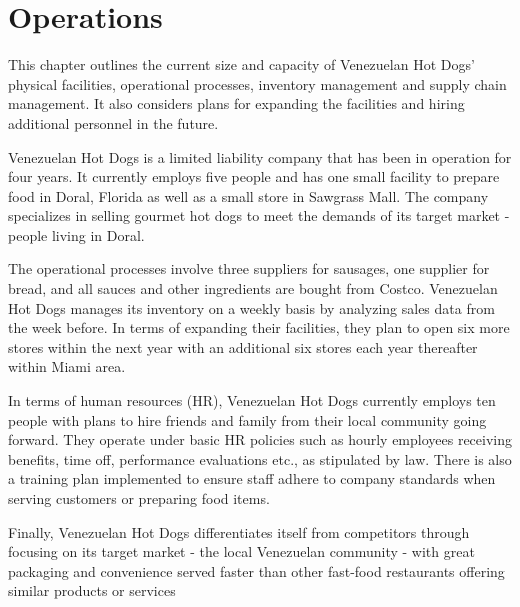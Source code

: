 

\section{Operations}\label{sec:operations}
This chapter outlines the current size and capacity of Venezuelan Hot Dogs' physical facilities, operational processes, inventory management and supply chain management. It also considers plans for expanding the facilities and hiring additional personnel in the future. 

Venezuelan Hot Dogs is a limited liability company that has been in operation for four years. It currently employs five people and has one small facility to prepare food in Doral, Florida as well as a small store in Sawgrass Mall. The company specializes in selling gourmet hot dogs to meet the demands of its target market - people living in Doral. 

The operational processes involve three suppliers for sausages, one supplier for bread, and all sauces and other ingredients are bought from Costco. Venezuelan Hot Dogs manages its inventory on a weekly basis by analyzing sales data from the week before. In terms of expanding their facilities, they plan to open six more stores within the next year with an additional six stores each year thereafter within Miami area. 

In terms of human resources (HR), Venezuelan Hot Dogs currently employs ten people with plans to hire friends and family from their local community going forward. They operate under basic HR policies such as hourly employees receiving benefits, time off, performance evaluations etc., as stipulated by law. There is also a training plan implemented to ensure staff adhere to company standards when serving customers or preparing food items. 

 Finally, Venezuelan Hot Dogs differentiates itself from competitors through focusing on its target market - the local Venezuelan community - with great packaging and convenience served faster than other fast-food restaurants offering similar products or services